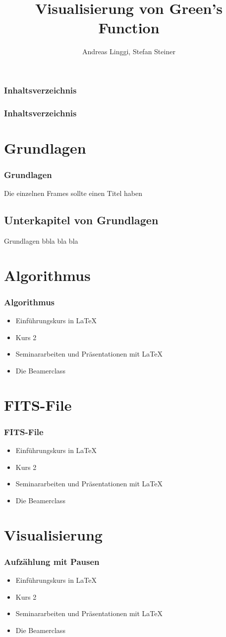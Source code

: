 \documentclass[hyperref={pdfpagelabels=false}]{beamer}
\title{Visualisierung von Green's Function}
\author[A. Linggi, S. Steiner]{ Andreas Linggi, Stefan Steiner}
\begin{document}
	\frame{\titlepage}

	\begin{frame}
	\frametitle{Inhaltsverzeichnis}
	\tableofcontents
	\end{frame} 
	
\begin{frame}
\frametitle{Inhaltsverzeichnis}
\tableofcontents
\end{frame} 


\section{Grundlagen} 
\begin{frame}
\frametitle{Grundlagen} 
Die einzelnen Frames sollte einen Titel haben 
\end{frame}


\subsection{Unterkapitel von Grundlagen}
\begin{frame} 
Grundlagen bbla bla bla
\end{frame}

\section{Algorithmus}
\begin{frame}
\frametitle{Algorithmus}
\begin{itemize}
\item Einf\"uhrungskurs in \LaTeX{}  
\item Kurs 2  
\item Seminararbeiten und Pr\"asentationen mit \LaTeX{} 
\item Die Beamerclass 
\end{itemize} 
\end{frame}

\section{FITS-File}
\begin{frame}
\frametitle{FITS-File}
\begin{itemize}
\item  Einf\"uhrungskurs in \LaTeX{} \pause 
\item  Kurs 2 \pause 
\item  Seminararbeiten und Pr\"asentationen mit \LaTeX{} \pause 
\item  Die Beamerclass
\end{itemize} 
\end{frame}

\section{Visualisierung}
\begin{frame}
\frametitle{Aufz\"ahlung mit Pausen}
\begin{itemize}[<+->]
\item  Einf\"uhrungskurs in \LaTeX{} 
\item  Kurs 2 
\item  Seminararbeiten und Pr\"asentationen mit \LaTeX{} 
\item  Die Beamerclass
\end{itemize} 
\end{frame}
	
\end{document}
